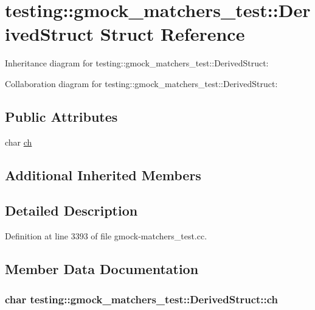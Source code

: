\hypertarget{structtesting_1_1gmock__matchers__test_1_1_derived_struct}{}\section{testing\+:\+:gmock\+\_\+matchers\+\_\+test\+:\+:Derived\+Struct Struct Reference}
\label{structtesting_1_1gmock__matchers__test_1_1_derived_struct}


Inheritance diagram for testing\+:\+:gmock\+\_\+matchers\+\_\+test\+:\+:Derived\+Struct\+:


Collaboration diagram for testing\+:\+:gmock\+\_\+matchers\+\_\+test\+:\+:Derived\+Struct\+:
\subsection*{Public Attributes}
\begin{DoxyCompactItemize}
\item 
char \hyperlink{structtesting_1_1gmock__matchers__test_1_1_derived_struct_abd7de960817b2c889f109ae6f2869f4c}{ch}
\end{DoxyCompactItemize}
\subsection*{Additional Inherited Members}


\subsection{Detailed Description}


Definition at line 3393 of file gmock-\/matchers\+\_\+test.\+cc.



\subsection{Member Data Documentation}
\subsubsection[{\texorpdfstring{ch}{ch}}]{\setlength{\rightskip}{0pt plus 5cm}char testing\+::gmock\+\_\+matchers\+\_\+test\+::\+Derived\+Struct\+::ch}\hypertarget{structtesting_1_1gmock__matchers__test_1_1_derived_struct_abd7de960817b2c889f109ae6f2869f4c}{}\label{structtesting_1_1gmock__matchers__test_1_1_derived_struct_abd7de960817b2c889f109ae6f2869f4c}


